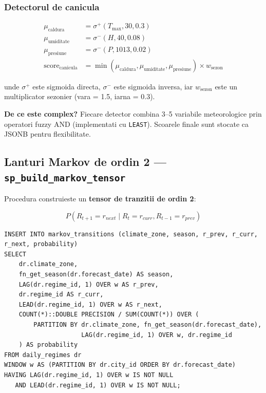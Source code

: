 \documentclass[12pt,a4paper]{article}
\begin{document}
\subsubsection{Detectorul de canicula}

\begin{align*}
\mu_{\text{caldura}} &= \sigma^+(T_{\text{max}}, 30, 0.3) \\
\mu_{\text{umiditate}} &= \sigma^-(H, 40, 0.08) \\
\mu_{\text{presiune}} &= \sigma^-(P, 1013, 0.02) \\
\text{score}_{\text{canicula}} &= \min(\mu_{\text{caldura}}, \mu_{\text{umiditate}}, \mu_{\text{presiune}}) \times w_{\text{sezon}}
\end{align*}

unde $\sigma^+$ este sigmoida directa, $\sigma^-$ este sigmoida inversa, iar $w_{\text{sezon}}$ este un multiplicator sezonier (vara = 1.5, iarna = 0.3).

\textbf{De ce este complex?} Fiecare detector combina 3--5 variabile meteorologice prin operatori fuzzy AND (implementati cu \texttt{LEAST}). Scoarele finale sunt stocate ca JSONB pentru flexibilitate.

\subsection{Lanturi Markov de ordin 2 --- \texttt{sp\_build\_markov\_tensor}}

Procedura construieste un \textbf{tensor de tranzitii de ordin 2}:

\begin{equation}
P(R_{t+1} = r_{next} \mid R_t = r_{curr}, R_{t-1} = r_{prev})
\end{equation}

\begin{lstlisting}[caption={Constructia tensorului Markov de ordin 2}]
INSERT INTO markov_transitions (climate_zone, season, r_prev, r_curr, r_next, probability)
SELECT
    dr.climate_zone,
    fn_get_season(dr.forecast_date) AS season,
    LAG(dr.regime_id, 1) OVER w AS r_prev,
    dr.regime_id AS r_curr,
    LEAD(dr.regime_id, 1) OVER w AS r_next,
    COUNT(*)::DOUBLE PRECISION / SUM(COUNT(*)) OVER (
        PARTITION BY dr.climate_zone, fn_get_season(dr.forecast_date),
                     LAG(dr.regime_id, 1) OVER w, dr.regime_id
    ) AS probability
FROM daily_regimes dr
WINDOW w AS (PARTITION BY dr.city_id ORDER BY dr.forecast_date)
HAVING LAG(dr.regime_id, 1) OVER w IS NOT NULL
   AND LEAD(dr.regime_id, 1) OVER w IS NOT NULL;
\end{lstlisting}
\end{document}

